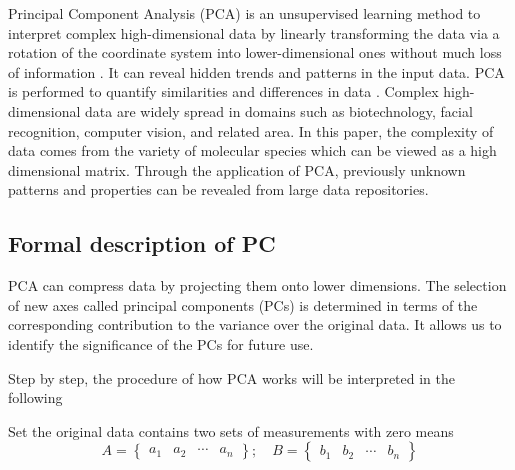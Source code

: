 \documentclass{aa}
\begin{document}
\begin{CJK*}{UTF8}{gbsn}
   Principal Component Analysis (PCA) is an unsupervised learning method to interpret complex high-dimensional data by linearly transforming the data via a rotation of the coordinate system into lower-dimensional ones without much loss of information \citep{shlens2014tutorial}.
   It can reveal hidden trends and patterns in the input data.
   PCA is performed to quantify similarities and differences in data \citep{jere2019principal}.
   Complex high-dimensional data are widely spread in domains such as biotechnology, facial recognition, computer vision, and related area. 
   In this paper, the complexity of data comes from the variety of molecular species which can be viewed as a high dimensional matrix. 
   Through the application of PCA, previously unknown patterns and properties can be revealed from large data repositories.
   
   
\subsection{Formal description of PC}
   
   PCA can compress data by projecting them onto lower dimensions. The selection of new axes called principal components (PCs) is determined in terms of the corresponding contribution to the variance over the original data. It allows us to identify the significance of the PCs for future use.
   
   Step by step, the procedure of how PCA works will be interpreted in the following \citep{abdi2010principal,jolliffe2016principal}
  
   Set the original data contains two sets of measurements with zero means
   \begin{equation}
     A = \begin{Bmatrix}
            a_{1}      & a_{2}      & \cdots & a_{n} 
         \end{Bmatrix}  ; \quad
     B = \begin{Bmatrix}
            b_{1}      & b_{2}      & \cdots & b_{n} 
         \end{Bmatrix}
   \end{equation}
   

\end{CJK*}
\end{document}

